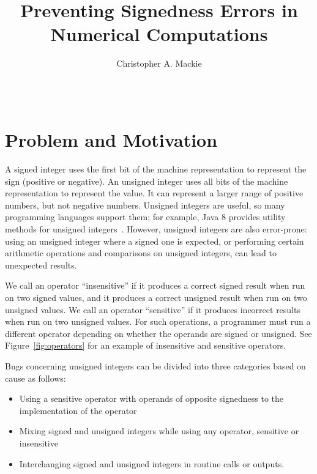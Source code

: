 \documentclass{sig-alternate-05-2015}
\begin{document}
\setlength{\pdfpageheight}{\paperheight}
\setlength{\pdfpagewidth}{\paperwidth}

\title{Preventing Signedness Errors in Numerical Computations}

\author{
Christopher A. Mackie\\
       \\
       \\
}

\maketitle

\section{Problem and Motivation}

A signed integer uses the first bit of the machine representation to
represent the sign (positive or negative).  An unsigned integer uses all
bits of the machine representation to represent the value.  It can
represent a larger range of positive numbers, but not negative numbers.
Unsigned integers are useful, so many programming languages support them;
for example, Java 8 provides utility methods for unsigned
integers~\cite{JDK8UnsignedIntegerArithmetic2012}.  However, unsigned
integers are also error-prone:  using an unsigned integer where a signed
one is expected, or performing certain arithmetic operations and
comparisons on unsigned integers, can lead to unexpected results.

We call an operator ``insensitive'' if it produces a correct signed result
when run on two signed values, and it produces a correct unsigned result
when run on two unsigned values.  We call an operator ``sensitive'' if it
produces incorrect results when run on two unsigned values.  For such
operations, a programmer must run a different operator depending on whether
the operands are signed or unsigned.  See Figure~\ref{fig:operators} for
an example of insensitive and sensitive operators.

Bugs concerning unsigned integers can be divided into three categories based on cause as follows:

\begin{itemize}\itemsep 0pt \parskip 0pt
  \item Using a sensitive operator with operands of opposite signedness to the implementation of the operator
  \item Mixing signed and unsigned integers while using any operator, sensitive or insensitive
  \item Interchanging signed and unsigned integers in routine calls or outputs.
\end{itemize}
\end{document}
